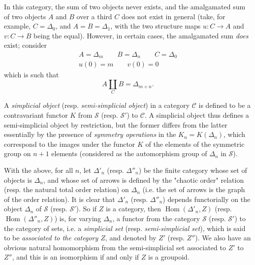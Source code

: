   In this category, the sum of two objects never exists, and the amalgamated sum of two objects \(A\) and \(B\) over a third \(C\) does not exist in general (take, for example, \(C=\Delta _0\), and \(A=B=\Delta _1\), with the two structure maps \(u\colon  C\to  A\) and \(v\colon  C\to  B\) being the equal).
  However, in certain cases, the amalgamated sum \emph{does} exist;
  consider
  \[     \begin {gathered}       A = \Delta _m       \qquad  B = \Delta _n       \qquad  C = \Delta _0     \\u(0) = m       \qquad  v(0) = 0     \end {gathered}   \]
  which is such that
  \[     A\coprod _C B     = \Delta _{m+n}.   \]\par{}A \emph{simplicial object} (resp. \emph{semi-simplicial object}) in a category \(\mathcal {C}\) is defined to be a contravariant functor \(K\) from \(\mathcal {S}\) (resp. \(\mathcal {S}'\)) to \(\mathcal {C}\).
  A simplicial object thus defines a semi-simplicial object by restriction, but the former differs from the latter essentially by the presence of \emph{symmetry operations} in the \(K_n=K(\Delta _n)\), which correspond to the images under the functor \(K\) of the elements of the symmetric group on \(n+1\) elements (considered as the automorphism group of \(\Delta _n\) in \(\mathcal {S}\)).\par{}With the above, for all \(n\), let \(\Delta '_n\) (resp. \(\Delta ''_n\)) be the finite category whose set of objects is \(\Delta _n\), and whose set of arrows is defined by the "chaotic order" relation (resp. the natural total order relation) on \(\Delta _n\) (i.e. the set of arrows is the graph of the order relation).
  It is clear that \(\Delta '_n\) (resp. \(\Delta ''_n\)) depends functorially on the object \(\Delta _n\) of \(\mathcal {S}\) (resp. \(\mathcal {S}'\)).
  So if \(Z\) is a category, then \(\operatorname {Hom}(\Delta '_n,Z)\) (resp. \(\operatorname {Hom}(\Delta ''_n,Z)\)) is, for varying \(\Delta _n\), a functor from the category \(\mathcal {S}\) (resp. \(\mathcal {S}'\)) to the category of sets, i.e. a \emph{simplicial set} (resp. \emph{semi-simplicial set}), which is said to be \emph{associated to the category \(Z\)}, and denoted by \(Z'\) (resp. \(Z''\)).
  We also have an obvious natural homomorphism from the semi-simplicial set associated to \(Z'\) to \(Z''\), and this is an isomorphism if and only if \(Z\) is a groupoid.

